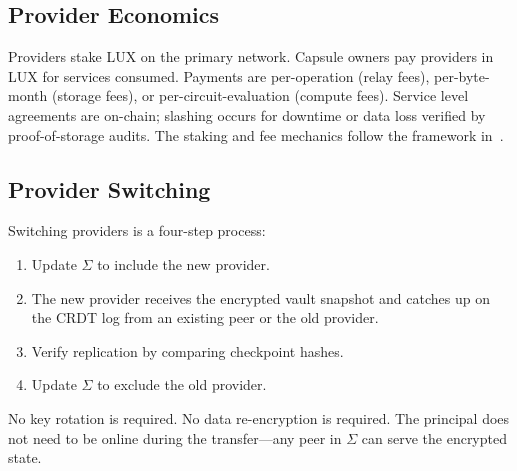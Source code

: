 \subsection{Provider Economics}

Providers stake LUX on the primary network. Capsule owners pay providers in LUX
for services consumed. Payments are per-operation (relay fees), per-byte-month
(storage fees), or per-circuit-evaluation (compute fees). Service level
agreements are on-chain; slashing occurs for downtime or data loss verified
by proof-of-storage audits. The staking and fee mechanics follow the framework
in~\cite{lux-tokenomics}.

\subsection{Provider Switching}

Switching providers is a four-step process:
\begin{enumerate}[nosep]
  \item Update $\Sigma$ to include the new provider.
  \item The new provider receives the encrypted vault snapshot and catches up
        on the CRDT log from an existing peer or the old provider.
  \item Verify replication by comparing checkpoint hashes.
  \item Update $\Sigma$ to exclude the old provider.
\end{enumerate}

No key rotation is required. No data re-encryption is required. The principal
does not need to be online during the transfer---any peer in $\Sigma$ can serve
the encrypted state.

